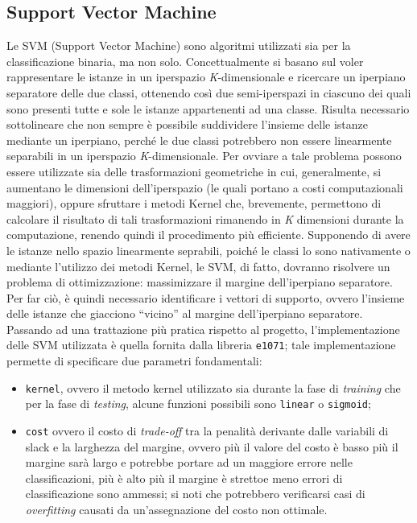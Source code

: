 \subsection{Support Vector Machine}
Le SVM (Support Vector Machine) sono algoritmi utilizzati sia per la classificazione binaria, ma non solo. 
Concettualmente si basano sul voler rappresentare le istanze in un iperspazio \textit{K}-dimensionale e ricercare un iperpiano separatore delle due classi, ottenendo così due semi-iperspazi in ciascuno dei quali sono presenti tutte e sole le istanze appartenenti ad una classe.
Risulta necessario sottolineare che non sempre è possibile suddividere l'insieme delle istanze mediante un iperpiano, perché le due classi potrebbero non essere linearmente separabili in un iperspazio \textit{K}-dimensionale.
Per ovviare a tale problema possono essere utilizzate sia delle trasformazioni geometriche in cui, generalmente, si aumentano le dimensioni dell'iperspazio (le quali portano a costi computazionali maggiori), oppure sfruttare i metodi Kernel che, brevemente, permettono di calcolare il risultato di tali trasformazioni rimanendo in \textit{K} dimensioni durante la computazione, renendo quindi il procedimento più efficiente.
Supponendo di avere le istanze nello spazio linearmente seprabili, poiché le classi lo sono nativamente o mediante l'utilizzo dei metodi Kernel, le SVM, di fatto, dovranno risolvere un problema di ottimizzazione: massimizzare il margine dell'iperpiano separatore.
Per far ciò, è quindi necessario identificare i vettori di supporto, ovvero l'insieme delle istanze che giacciono “vicino” al margine dell'iperpiano separatore.\\
Passando ad una trattazione più pratica rispetto al progetto, l'implementazione delle SVM utilizzata è quella fornita dalla libreria \texttt{e1071}; tale implementazione permette di specificare due parametri fondamentali:\begin{itemize}
	\item \texttt{kernel}, ovvero il metodo kernel utilizzato sia durante la fase di \textit{training} che per la fase di \textit{testing}, alcune funzioni possibili sono \texttt{linear} o \texttt{sigmoid};
	\item \texttt{cost} ovvero il costo di \textit{trade-off} tra la penalità derivante dalle variabili di slack e la larghezza del margine, ovvero più il valore del costo è basso più il margine sarà largo e potrebbe portare ad un maggiore errore nelle classificazioni, più è alto più il margine è strettoe meno errori di classificazione sono ammessi; si noti che potrebbero verificarsi casi di \textit{overfitting} causati da un'assegnazione del costo non ottimale. 
\end{itemize}
